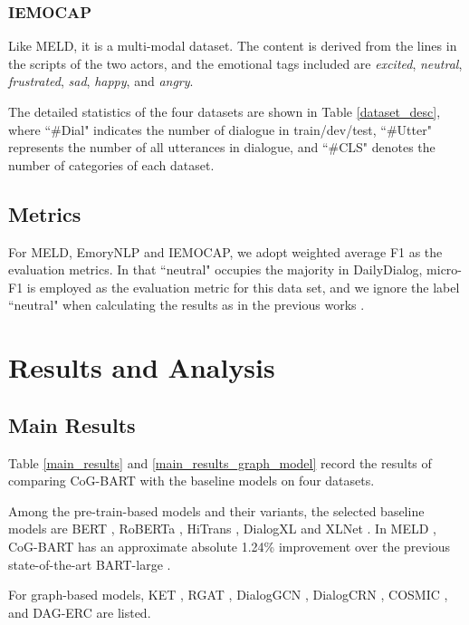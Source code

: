 \documentclass[letterpaper]{article} \usepackage{aaai22}  \usepackage{times}  \usepackage{helvet}  \usepackage{courier}  \usepackage[hyphens]{url}  \usepackage{graphicx} \urlstyle{rm} \def\UrlFont{\rm}  \usepackage{natbib}  \usepackage{caption} \DeclareCaptionStyle{ruled}{labelfont=normalfont,labelsep=colon,strut=off} \frenchspacing  \setlength{\pdfpagewidth}{8.5in}  \setlength{\pdfpageheight}{11in}  \usepackage{algorithm}
\begin{document}
\subsubsection{IEMOCAP}
Like MELD, it is a multi-modal dataset. The content is derived from the lines in the scripts of the two actors, and the emotional tags included are \textit{excited}, \textit{neutral}, \textit{frustrated}, \textit{sad}, \textit{happy}, and \textit{angry}.

The detailed statistics of the four datasets are shown in Table \ref{dataset_desc}, where ``\#Dial" indicates the number of dialogue in train/dev/test, ``\#Utter" represents the number of all utterances in dialogue, and ``\#CLS" denotes the number of categories of each dataset.

\subsection{Metrics}
For MELD, EmoryNLP and IEMOCAP, we adopt weighted average F1 as the evaluation metrics. In that ``neutral" occupies the majority in DailyDialog, micro-F1 is employed as the evaluation metric for this data set, and we ignore the label ``neutral" when calculating the results as in the previous works \cite{todkat, dag-erc}.




\section{Results and Analysis}
\subsection{Main Results}


Table \ref{main_results} and \ref{main_results_graph_model} record the results of comparing CoG-BART with the baseline models on four datasets.

Among the pre-train-based models and their variants, the selected baseline models are BERT \cite{devlin-etal-2019-bert}, RoBERTa \cite{roberta}, HiTrans \cite{li-etal-2020-hitrans}, DialogXL \cite{dialog-xl} and XLNet \cite{xlnet}.
In MELD \cite{poria-etal-2019-meld}, CoG-BART has an approximate absolute 1.24\% improvement over the previous state-of-the-art BART-large \cite{lewis-etal-2020-bart}.

For graph-based models, KET \cite{zhong-2019-ket}, RGAT \cite{rgat}, DialogGCN \cite{ghosal-etal-2019-dialoguegcn}, DialogCRN \cite{dialogcrn},  COSMIC \cite{ghosal-etal-2020-cosmic}, and DAG-ERC \cite{dag-erc} are listed.
\end{document}

